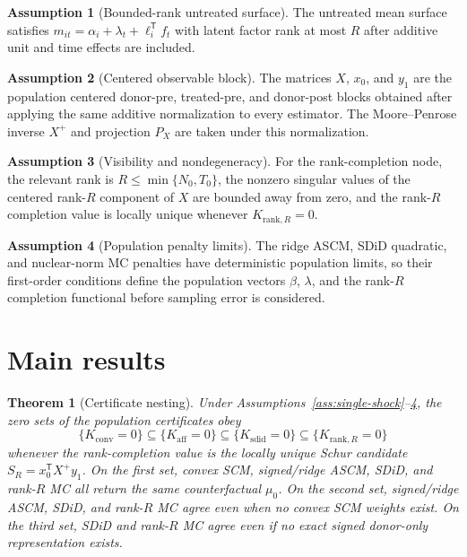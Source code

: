 \documentclass[11pt]{article}
\newcommand{\transpose}{\mathsf{T}}
\theoremstyle{definition}
\newtheorem{assumption}{Assumption}
\theoremstyle{plain}
\newtheorem{theorem}{Theorem}
\theoremstyle{remark}
\begin{document}
\begin{assumption}[Bounded-rank untreated surface]\label{ass:bounded-rank}
The untreated mean surface satisfies
$m_{it}=\alpha_i+\lambda_t+\ell_i^{\transpose}f_t$ with latent factor rank at
most $R$ after additive unit and time effects are included.
\end{assumption}

\begin{assumption}[Centered observable block]\label{ass:centered-block}
The matrices $X$, $x_0$, and $y_1$ are the population centered donor-pre,
treated-pre, and donor-post blocks obtained after applying the same additive
normalization to every estimator. The Moore--Penrose inverse $X^+$ and
projection $P_X$ are taken under this normalization.
\end{assumption}

\begin{assumption}[Visibility and nondegeneracy]\label{ass:visibility}
For the rank-completion node, the relevant rank is
$R\le \min\{N_0,T_0\}$, the nonzero singular values of the centered rank-$R$
component of $X$ are bounded away from zero, and the rank-$R$ completion value
is locally unique whenever $K_{\mathrm{rank},R}=0$.
\end{assumption}

\begin{assumption}[Population penalty limits]\label{ass:penalty-limits}
The ridge ASCM, SDiD quadratic, and nuclear-norm MC penalties have deterministic
population limits, so their first-order conditions define the population
vectors $\beta$, $\lambda$, and the rank-$R$ completion functional before
sampling error is considered.
\end{assumption}

\section{Main results}
\begin{theorem}[Certificate nesting]\label{thm:certificate-nesting}
Under Assumptions~\ref{ass:single-shock}--\ref{ass:penalty-limits}, the zero
sets of the population certificates obey
\[
\{K_{\mathrm{conv}}=0\}\subseteq
\{K_{\mathrm{aff}}=0\}\subseteq
\{K_{\mathrm{sdid}}=0\}\subseteq
\{K_{\mathrm{rank},R}=0\}
\]
whenever the rank-completion value is the locally unique Schur candidate
$S_R=x_0^{\transpose}X^+y_1$. On the first set, convex SCM, signed/ridge ASCM, SDiD,
and rank-$R$ MC all return the same counterfactual $\mu_0$. On the second set,
signed/ridge ASCM, SDiD, and rank-$R$ MC agree even when no convex SCM weights
exist. On the third set, SDiD and rank-$R$ MC agree even if no exact signed
donor-only representation exists.
\end{theorem}
\end{document}

